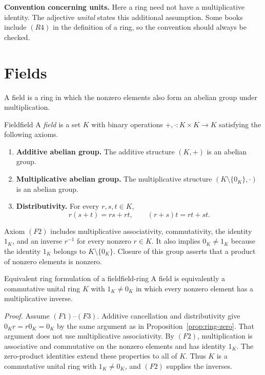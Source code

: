 \documentclass[10pt,a4paper]{article}
\begin{document}
\medskip
\noindent\textbf{\color{vuBurgundy}Convention concerning units.}
Here a ring need not have a multiplicative identity. The adjective
\emph{unital} states this additional assumption. Some books include $(R4)$ in
the definition of a ring, so the convention should always be checked.


\section{Fields}

A field is a ring in which the nonzero elements also form an abelian group
under multiplication.

\begin{definition}{Field}{field}
A \emph{field} is a set $K$ with binary operations
$+,\cdot:K\times K\to K$ satisfying the following axioms.
\begin{enumerate}[label=\textup{(F\arabic*)}]
  \item \textbf{Additive abelian group.} The additive structure $(K,+)$ is
  an abelian group.

  \item \textbf{Multiplicative abelian group.} The multiplicative structure
  $(K\setminus\{0_K\},\cdot)$ is an abelian group.

  \item \textbf{Distributivity.} For every $r,s,t\in K$,
  \[
    r(s+t)=rs+rt,
    \qquad
    (r+s)t=rt+st.
  \]
\end{enumerate}
\end{definition}

Axiom $(F2)$ includes multiplicative associativity, commutativity, the identity
$1_K$, and an inverse $r^{-1}$ for every nonzero $r\in K$. It also implies
$0_K\neq1_K$ because the identity $1_K$ belongs to $K\setminus\{0_K\}$.
Closure of this group asserts that a product of nonzero elements is nonzero.

\begin{proposition}{Equivalent ring formulation of a field}{field-ring}
A field is equivalently a commutative unital ring $K$ with $1_K\neq0_K$ in
which every nonzero element has a multiplicative inverse.
\end{proposition}

\textit{Proof.}
Assume $(F1)$--$(F3)$. Additive cancellation and distributivity give
$0_Kr=r0_K=0_K$ by the same argument as in
Proposition~\ref{prop:ring-zero}. That argument does not use multiplicative
associativity. By $(F2)$, multiplication is associative and commutative on
the nonzero elements and has identity $1_K$. The zero-product identities
extend these properties to all of $K$. Thus $K$ is a commutative unital ring
with $1_K\neq0_K$, and $(F2)$ supplies the inverses.
\end{document}
